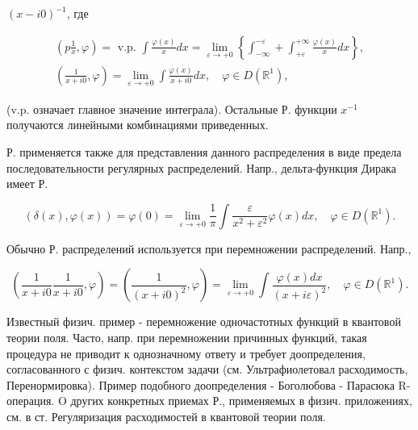 \documentclass[10pt]{article}
\begin{document}
$(x-i 0)^{-1}$, где



\[

\begin{gathered}

\left(p \frac{1}{x}, \varphi\right)=\text { v.p. } \int \frac{\varphi(x)}{x} d x=\lim _{\varepsilon \rightarrow+0}\left\{\int_{-\infty}^{-\varepsilon}+\int_{+\varepsilon}^{+\infty} \frac{\varphi(x)}{x} d x\right\}, \\

\left(\frac{1}{x+i 0}, \varphi\right)=\lim _{\varepsilon \rightarrow+0} \int \frac{\varphi(x)}{x+i 0} d x, \quad \varphi \in D\left(\mathbb{R}^{1}\right),

\end{gathered}

\]



(v.p. означает главное значение интеграла). Остальные Р. функции $x^{-1}$ получаются линейными комбинациями приведенных.



Р. применяется также для представления данного распределения в виде предела последовательности регулярных распределений. Напр., дельта-функция Дирака имеет Р.



\[

(\delta(x), \varphi(x))=\varphi(0)=\lim _{\varepsilon \rightarrow+0} \frac{1}{\pi} \int \frac{\varepsilon}{x^{2}+\varepsilon^{2}} \varphi(x) d x, \quad \varphi \in D\left(\mathbb{R}^{1}\right) .

\]



Обычно Р. распределений используется при перемножении распределений. Напр.,



\[

\left(\frac{1}{x+i 0} \frac{1}{x+i 0}, \varphi\right)=\left(\frac{1}{(x+i 0)^{2}}, \varphi\right)=\lim _{\varepsilon \rightarrow+0} \int \frac{\varphi(x) d x}{(x+i \varepsilon)^{2}}, \quad \varphi \in D\left(\mathbb{R}^{1}\right) .

\]



Известный физич. пример - перемножение одночастотных функций в квантовой теории поля. Часто, напр. при перемножении причинных функций, такая процедура не приводит к однозначному ответу и требует доопределения, согласованного с физич. контекстом задачи (см. Ультрафиолетовал расходимость, Перенормировка). Пример подобного доопределения - Боголюбова - Парасюка R-операция. O других конкретных приемах Р., применяемых в физич. приложениях, см. в ст. Регуляризация расходимостей в квантовой теории поля.
\end{document}
